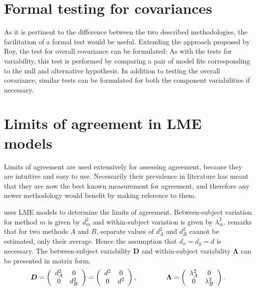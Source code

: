 \documentclass[12pt, a4paper]{report}
\theoremstyle{plain}
\theoremstyle{definition}
\theoremstyle{remark}
\begin{document}
\section{Formal testing for covariances }
As it is pertinent to the difference between the two described methodologies, the facilitation of a formal test would be useful. Extending the approach proposed by Roy, the test for overall covariance can be formulated:
As with the tests for variability, this test is performed by comparing a pair of model fits corresponding to the null and alternative hypothesis. In addition to testing the overall covariance, similar tests can be formulated for both the component variabilities if necessary.











\section{Limits of agreement in LME models}

Limits of agreement are used extensively for assessing agreement, because they are intuitive and easy to use.
Necessarily their prevalence in literature has meant that they are now the best known measurement for agreement, and therefore any newer methodology would benefit by making reference to them.

\citet{BXC2008} uses LME models to determine the limits of agreement. Between-subject variation for method $m$ is given by $d^2_{m}$ and within-subject variation is given by $\lambda^2_{m}$.  \citet{BXC2008} remarks that for two methods $A$ and $B$, separate values of $d^2_{A}$ and $d^2_{B}$ cannot be estimated, only their average. Hence the assumption that $d_{x}= d_{y}= d$ is necessary. The between-subject variability $\boldsymbol{D}$ and within-subject variability $\boldsymbol{\Lambda}$ can be presented in matrix form,\[
\boldsymbol{D} = \left(%
\begin{array}{cc}
d^2_{A}& 0 \\
0 & d^2_{B} \\
\end{array}%
\right)=\left(%
\begin{array}{cc}
d^2& 0 \\
0 & d^2\\
\end{array}%
\right),
\hspace{1.5cm}
\boldsymbol{\Lambda} = \left(%
\begin{array}{cc}
\lambda^2_{A}& 0 \\
0 & \lambda^2_{B} \\
\end{array}%
\right).
\]
\end{document}
